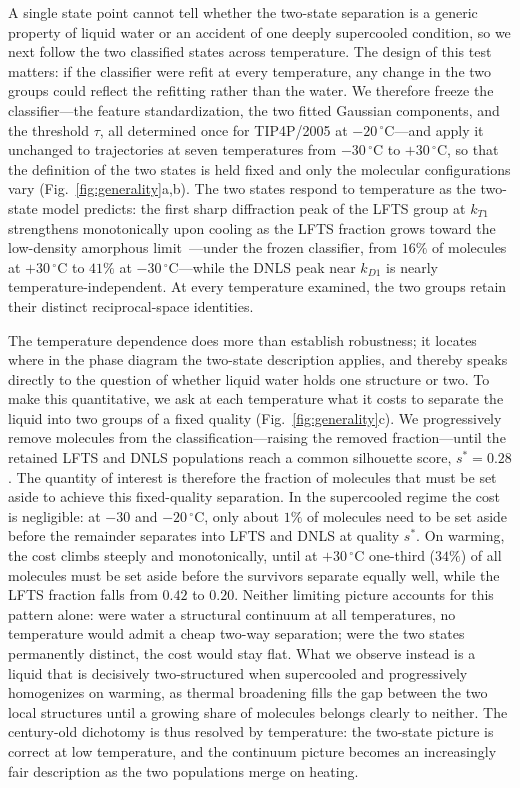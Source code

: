 \documentclass[aps, amsmath,amssymb, reprint, twocolumn, superscriptaddress]{revtex4-2}
\begin{document}
A single state point cannot tell whether the two-state separation is a generic property of liquid water or an accident of one deeply supercooled condition, so we next follow the two classified states across temperature. The design of this test matters: if the classifier were refit at every temperature, any change in the two groups could reflect the refitting rather than the water. We therefore freeze the classifier---the feature standardization, the two fitted Gaussian components, and the threshold $\tau$, all determined once for TIP4P/2005 at $-20\,^\circ$C---and apply it unchanged to trajectories at seven temperatures from $-30\,^\circ$C to $+30\,^\circ$C, so that the definition of the two states is held fixed and only the molecular configurations vary (Fig.~\ref{fig:generality}a,b). The two states respond to temperature as the two-state model predicts: the first sharp diffraction peak of the LFTS group at $k_{T1}$ strengthens monotonically upon cooling as the LFTS fraction grows toward the low-density amorphous limit~\cite{shi-2019}---under the frozen classifier, from $16\%$ of molecules at $+30\,^\circ$C to $41\%$ at $-30\,^\circ$C---while the DNLS peak near $k_{D1}$ is nearly temperature-independent. At every temperature examined, the two groups retain their distinct reciprocal-space identities.

The temperature dependence does more than establish robustness; it locates where in the phase diagram the two-state description applies, and thereby speaks directly to the question of whether liquid water holds one structure or two. To make this quantitative, we ask at each temperature what it costs to separate the liquid into two groups of a fixed quality (Fig.~\ref{fig:generality}c). We progressively remove molecules from the classification---raising the removed fraction---until the retained LFTS and DNLS populations reach a common silhouette score, $s^{*}=0.28$. The quantity of interest is therefore the fraction of molecules that must be set aside to achieve this fixed-quality separation. In the supercooled regime the cost is negligible: at $-30$ and $-20\, ^\circ$C, only about $1\%$ of molecules need to be set aside before the remainder separates into LFTS and DNLS at quality $s^{*}$. On warming, the cost climbs steeply and monotonically, until at $+30\, ^\circ$C one-third ($34\%$) of all molecules must be set aside before the survivors separate equally well, while the LFTS fraction falls from $0.42$ to $0.20$. Neither limiting picture accounts for this pattern alone: were water a structural continuum at all temperatures, no temperature would admit a cheap two-way separation; were the two states permanently distinct, the cost would stay flat. What we observe instead is a liquid that is decisively two-structured when supercooled and progressively homogenizes on warming, as thermal broadening fills the gap between the two local structures until a growing share of molecules belongs clearly to neither. The century-old dichotomy is thus resolved by temperature: the two-state picture is correct at low temperature, and the continuum picture becomes an increasingly fair description as the two populations merge on heating.
\end{document}

